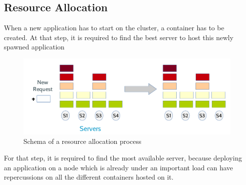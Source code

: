 \subsection{Resource Allocation}

When a new application has to start on the cluster, a container has to be
created.  At that step, it is required to find the best server to host this
newly spawned application

\begin{figure}[h!]
	\includegraphics[width=\textwidth]{./Images/resourceallocation.png}
	\caption{Schema of a resource allocation process}
\end{figure}

For that step, it is required to find the most available server, because
deploying an application on a node which is already under an important load can
have repercussions on all the different containers hosted on it.
